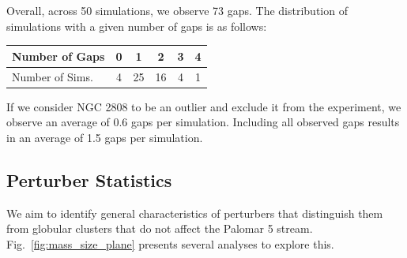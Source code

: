 \documentclass[draft]{aa}
\begin{document}
    Overall, across 50 simulations, we observe 73 gaps. The distribution of simulations with a given number of gaps is as follows: \begin{tabular}{|l|c|c|c|c|c|}
      \hline
      Number of Gaps & 0 & 1 & 2 & 3 & 4 \\
      \hline
      Number of Sims. & 4 & 25 & 16 & 4 & 1 \\
      \hline
    \end{tabular} If we consider NGC 2808 to be an outlier and exclude it from the experiment, we observe an average of 0.6 gaps per simulation. Including all observed gaps results in an average of 1.5 gaps per simulation.


    

    



 
 \subsection*{Perturber Statistics}
  

    We aim to identify general characteristics of perturbers that distinguish them from globular clusters that do not affect the Palomar 5 stream. Fig.~\ref{fig:mass_size_plane} presents several analyses to explore this.
\end{document}
